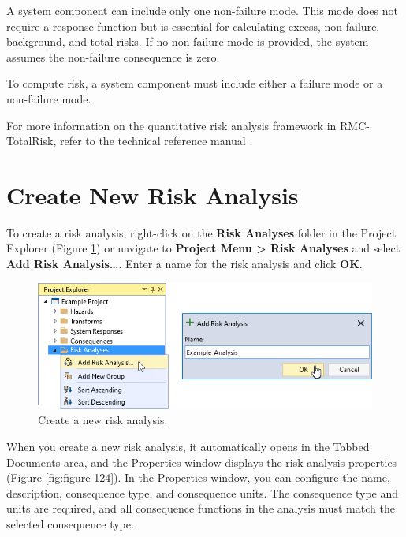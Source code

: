 \documentclass[
]{book}
\begin{document}
A system component can include only one non-failure mode. This mode does not require a response function but is essential for calculating excess, non-failure, background, and total risks. If no non-failure mode is provided, the system assumes the non-failure consequence is zero.

To compute risk, a system component must include either a failure mode or a non-failure mode.

For more information on the quantitative risk analysis framework in RMC-TotalRisk, refer to the technical reference manual \citep{cite-TechRef}.

\hypertarget{create-new-risk-analysis}{%
\section{Create New Risk Analysis}\label{create-new-risk-analysis}}

To create a risk analysis, right-click on the \textbf{Risk Analyses} folder in the Project Explorer (Figure \ref{fig:figure-123}) or navigate to \textbf{Project Menu \textgreater{} Risk Analyses} and select \textbf{Add Risk Analysis\ldots{}}. Enter a name for the risk analysis and click \textbf{OK}.

\begin{figure}

{\centering \includegraphics{images/figure123} 

}

\caption{Create a new risk analysis.}\label{fig:figure-123}
\end{figure}

When you create a new risk analysis, it automatically opens in the Tabbed Documents area, and the Properties window displays the risk analysis properties (Figure \ref{fig:figure-124}). In the Properties window, you can configure the name, description, consequence type, and consequence units. The consequence type and units are required, and all consequence functions in the analysis must match the selected consequence type.
\end{document}
